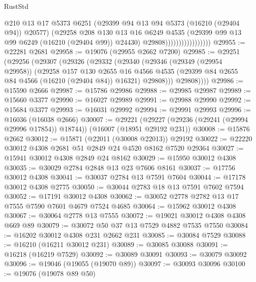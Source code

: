 \begin{lexlean}{RustStd}
\begin{coremodule}
                                    @210
                                    @13
                                    @17
                                    @5373
                                    @6251
                                    (@29399 @94 @13 @94 @5373 (@16210 (@29404 @94)) @20577)
                                    (@29258
                                      @208
                                      @130
                                      @13
                                      @16
                                      @6249
                                      @4535
                                      (@29399 @99 @13 @99 @6249 (@16210 (@29404 @99)) @24430)
                                      @29808)))))))))))))))))
@29955 := @22281 @2681
@29958 := @19076 (@29955 @2662 @7200)
@29985 := @29251
    (@29256
      (@29307
        (@29326
          (@29332
            (@29340
              (@29346
                (@29349 (@29954 @29958))
                (@29258
                  @157
                  @130
                  @2655
                  @16
                  @4566
                  @4535
                  (@29399 @84 @2655 @84 @4566 (@16210 (@29404 @84)) @16321)
                  @29808)))
            @29808))))
@29986 := @15590 @2666
@29987 := @15786 @29986
@29988 := @29985 @29987
@29989 := @15660 @3377
@29990 := @16027 @29989
@29991 := @29988 @29990
@29992 := @15684 @3377
@29993 := @16031 @29992
@29994 := @29991 @29993
@29996 := @16036 (@16038 @2666)
@30007 := @29221
    (@29227 (@29236 (@29241 (@29994 @29996 @17854)) @18744))
    (@16007 (@18951 @29192 @231))
@30008 := @15876 @2662
@30012 := @15871 (@22011 (@30008 @22013)) @29192
@30022 := @22220 @30012 @4308 @2681 @51 @2849 @24 @4520 @8162 @7520 @29364
@30027 := @15941 @30012 @4308 @2849 @24 @8162
@30029 := @15950 @30012 @4308
@30035 := @30029 @2784 @2848 @13 @23 @7606 @8161
@30037 := @17756 @30012 @4308
@30041 := @30037 @2784 @13 @7591 @7604
@30044 := @17178 @30012 @4308 @2775
@30050 := @30044 @2783 @18 @13 @7591 @7602 @7594
@30052 := @17191 @30012 @4308
@30062 := @30052 @2778 @2782 @13 @17 @7555 @7590 @7601 @4679 @7524 @4685
@30064 := @15962 @30012 @4308
@30067 := @30064 @2778 @13 @7555
@30072 := @19021 @30012 @4308 @4308 @669 @89
@30079 := @30072 @50 @37 @13 @7529 @4882 @7535 @7550
@30084 := @16202 @30012 @4308 @231 @2662 @231
@30085 := @30084 @7529
@30088 := @16210 (@16211 @30012 @231)
@30089 := @30085 @30088
@30091 := @16218 (@16219 @7529)
@30092 := @30089 @30091
@30093 := @30079 @30092
@30096 := @19046 (@19055 (@19070 @89))
@30097 := @30093 @30096
@30100 := @19076 (@19078 @89 @50)

\end{coremodule}
\end{lexlean}
